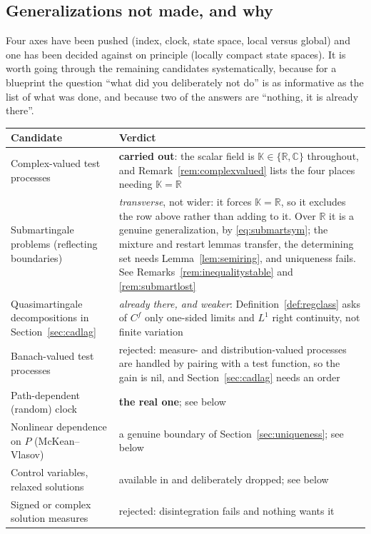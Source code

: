 \documentclass[11pt,a4paper]{article}
\theoremstyle{plain}
\theoremstyle{definition}
\theoremstyle{remark}
\newcommand{\R}{\mathbb{R}}
\newcommand{\K}{\mathbb{K}}
\newcommand{\C}{\mathbb{C}}
\newcommand{\CPS}{\cite{CPS23}}
\begin{document}
\subsection{Generalizations not made, and why}
\label{ssec:notgeneralized}

Four axes have been pushed (index, clock, state space, local versus global) and
one has been decided against on principle (locally compact state spaces).  It is
worth going through the remaining candidates systematically, because for a
blueprint the question ``what did you deliberately not do'' is as informative as
the list of what was done, and because two of the answers are ``nothing, it is
already there''.

\medskip
\noindent
\begin{tabular}{@{}p{}p{}@{}}
\toprule
\textbf{Candidate} & \textbf{Verdict} \\
\midrule
Complex-valued test processes
  & \textbf{carried out}: the scalar field is $\K \in \{\R,\C\}$ throughout, and
    Remark~\ref{rem:complexvalued} lists the four places needing $\K = \R$ \\
Submartingale problems (reflecting boundaries)
  & \emph{transverse}, not wider: it forces $\K = \R$, so it excludes the row
    above rather than adding to it.  Over $\R$ it is a genuine generalization,
    by \eqref{eq:submartsym}; the mixture and restart lemmas transfer, the
    determining set needs Lemma~\ref{lem:semiring}, and uniqueness fails.  See
    Remarks~\ref{rem:inequalitystable} and \ref{rem:submartlost} \\
Quasimartingale decompositions in Section~\ref{sec:cadlag}
  & \emph{already there, and weaker}: Definition~\ref{def:regclass} asks of
    $C^f$ only one-sided limits and $L^1$ right continuity, not finite
    variation \\
Banach-valued test processes
  & rejected: measure- and distribution-valued processes are handled by pairing
    with a test function, so the gain is nil, and Section~\ref{sec:cadlag} needs
    an order \\
Path-dependent (random) clock
  & \textbf{the real one}; see below \\
Nonlinear dependence on $P$ (McKean--Vlasov)
  & a genuine boundary of Section~\ref{sec:uniqueness}; see below \\
Control variables, relaxed solutions
  & available in \CPS{} and deliberately dropped; see below \\
Signed or complex solution measures
  & rejected: disintegration fails and nothing wants it \\
\bottomrule
\end{tabular}
\end{document}
